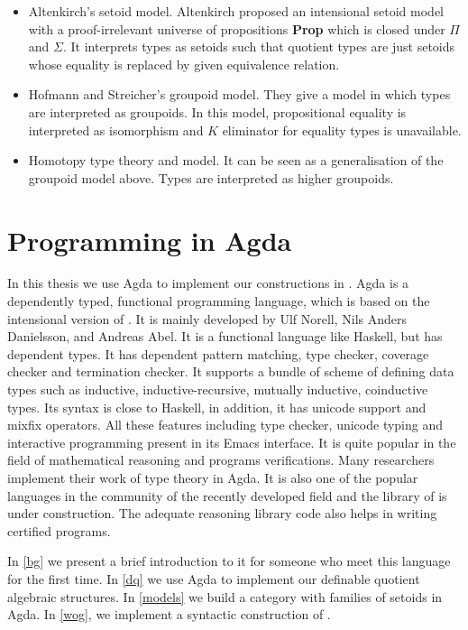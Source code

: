 \begin{itemize}

\item Altenkirch's setoid model. Altenkirch \cite{alti:lics99} proposed an intensional setoid model
with a proof-irrelevant universe of propositions \textbf{Prop} which
is closed under $\Pi$ and $\Sigma$. It interprets types as setoids
such that quotient types are just setoids whose equality is replaced
by given equivalence relation.

\item Hofmann and Streicher's groupoid model. They give a model in which
types are interpreted as groupoids. In this model, propositional
equality is interpreted as isomorphism and $K$ eliminator for equality
types is unavailable. 

\item Homotopy type theory and \wog model. It can be seen as a
generalisation of the groupoid model above. Types are interpreted as
higher groupoids.

\end{itemize}

\section{Programming in Agda}

In this thesis we use Agda to implement our constructions in \itt. 
Agda is a dependently typed, functional programming language, which is
based on the intensional version of \mltt. It is mainly developed by
Ulf Norell, Nils Anders Danielsson, and Andreas Abel.
It is a functional language like Haskell, but has dependent types. It has dependent pattern
matching, type checker, coverage checker and termination checker. It
supports a bundle of scheme of defining data types such as inductive, inductive-recursive, mutually inductive,
coinductive types. Its syntax is close to Haskell, in addition, it has
unicode support and mixfix operators. All these features including
type checker, unicode typing and interactive programming present in
its Emacs interface. It is quite popular in the field of mathematical reasoning and programs
verifications. Many researchers implement their work of type theory in
Agda. It is also one of the popular languages in the community of the recently
developed field \hott and the library of \hott is under construction.
The adequate reasoning library code also helps in writing certified programs.

In \autoref{bg} we present a brief introduction to it for someone
who meet this language for the first time. In \autoref{dq} we use Agda to implement our definable quotient algebraic structures. In \autoref{models} we build a category with families of setoids in Agda. In \autoref{wog}, we implement a syntactic construction of \wog.

